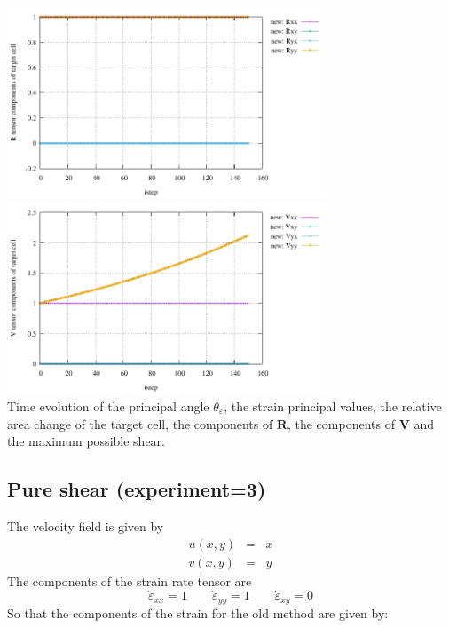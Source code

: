 \begin{center}
\includegraphics[width=9.5cm]{python_codes/fieldstone_89/results/vertical/R.pdf}
\includegraphics[width=9.5cm]{python_codes/fieldstone_89/results/vertical/V.pdf}\\
{\captionfont Time evolution of the principal angle $\theta_\varepsilon$, 
the strain principal values, the relative area change of the target cell, 
the components of ${\bm R}$, the components of ${\bm V}$ and the maximum
possible shear.}
\end{center}





\newpage
\subsection*{Pure shear (experiment=3)}

The velocity field is given by
\begin{eqnarray}
u(x,y)&=&x \nonumber\\
v(x,y)&=&y \nonumber
\end{eqnarray}
The components of the strain rate tensor are
\[
\dot\varepsilon_{xx} = 1 
\qquad
\dot\varepsilon_{yy} = 1
\qquad
\dot\varepsilon_{xy} = 0 
\]
So that the components of the strain for the old method are given by:




